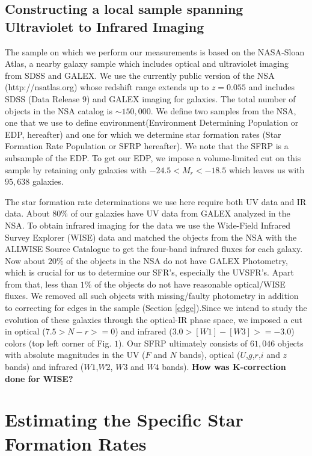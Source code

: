 \documentclass[iop]{emulateapj}
\begin{document}
\subsection{Constructing a local sample spanning Ultraviolet to Infrared Imaging}

The sample on which we perform our measurements is based on the NASA-Sloan 
Atlas, a nearby galaxy sample which includes optical and ultraviolet 
imaging from SDSS and GALEX. We use the currently public version 
of the NSA (http://nsatlas.org) whose redshift range extends up 
to $z = 0.055$ and includes SDSS (Data Release $9$) and GALEX 
imaging for galaxies. The total number of objects in the NSA 
catalog is $\sim 150,000$. We define two samples from the NSA, one that we use to define environment(Environment Determining Population or EDP, hereafter) and one for which we determine star 
formation rates (Star Formation Rate Population or SFRP hereafter). We note that the SFRP is a subsample of the EDP. To get our EDP, we impose a volume-limited cut on this sample by retaining only galaxies with $-24.5 <M_{r}< -18.5$ which leaves us with $95,638$ galaxies. 


The star formation rate determinations we use here
require both UV data and IR data. About 80\% of our 
galaxies have UV data from GALEX analyzed in the NSA.
To obtain infrared imaging for the data we use the Wide-Field Infrared Survey Explorer (WISE) data and 
matched the objects from the NSA with the ALLWISE Source Catalogue to get the four-band 
infrared fluxes for each galaxy.
Now about $20\%$ of the objects in the NSA do not have GALEX Photometry, which is crucial for us to determine our SFR's, especially the UVSFR's. Apart from that, less than $1\%$ of the objects do not have reasonable optical/WISE fluxes. We removed all such objects with missing/faulty photometry in addition to correcting for edges in the sample (Section \ref{edge}).Since we intend to study the evolution of these galaxies through the optical-IR phase space, we imposed a cut in optical ($7.5> N-r >=0 $) and infrared ($3.0> [W1]- [W3] >= -3.0$) colors (top left corner of Fig. $1$). Our SFRP ultimately consists of $61,046$ objects with absolute magnitudes in the UV ($F$ and $N$ bands), optical ($U$,$g$,$r$,$i$ and $z$ bands) and infrared ($W1$,$W2$, $W3$ and $W4$ bands). \textbf{How was K-correction done for WISE?} \\


\section{Estimating the Specific Star Formation Rates}
\end{document}
